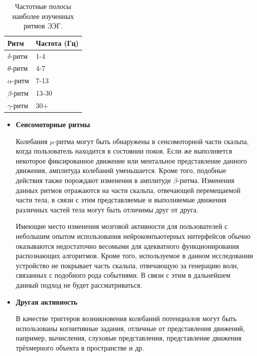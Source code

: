 \documentclass[12pt,fleqn]{article}
\begin{document}
\begin{table}[h]
\centering
\begin{tabular}{|l|l|}
\hline
Ритм & Частота (Гц) \\ \hline
$\delta$-ритм & 1-4 \\ \hline
$\theta$-ритм & 4-7 \\ \hline
$\alpha$-ритм & 7-13 \\ \hline
$\beta$-ритм & 13-30 \\ \hline
$\gamma$-ритм &  30+ \\ \hline
\end{tabular}
\caption{Частотные полосы наиболее изученных ритмов ЭЭГ.}
\end{table}

	\begin{itemize}
	\item
	{\bf Сенсомоторные ритмы}
	\par Колебания $\mu$-ритма могут быть обнаружены в сенсомоторной части скальпа, когда пользователь находится в состоянии покоя. Если же выполняется некоторое фиксированное движение или ментальное представление данного движения, амплитуда колебаний уменьшается. Кроме того, подобные действия также порождают изменения в амплитуде $\beta$-ритма. Изменения данных ритмов отражаются на части скальпа, отвечающей перемещаемой части тела, в связи с этим представляемые и выполняемые движения различных частей тела могут быть отличимы друг от друга.
	\par Имеющие место изменения мозговой активности для пользователей с небольшим опытом использования нейрокомпьютерных интерфейсов обычно оказываются недостаточно весомыми для адекватного функционирования распознающих алгоритмов. Кроме того, используемое в данном исследовании устройство не покрывает часть скальпа, отвечающую за генерацию волн, связанных с подобного рода событиями. В связи с этим в дальнейшем данный подход не будет рассматриваться.
	\item
	{\bf Другая активность}
	\par В качестве триггеров возникновения колебаний потенциалов могут быть использованы когнитивные задания, отличные от представления движений, например, вычисления, слуховые представления, представление движения трёхмерного объекта в пространстве и др.
	\end{itemize}
\end{document}
